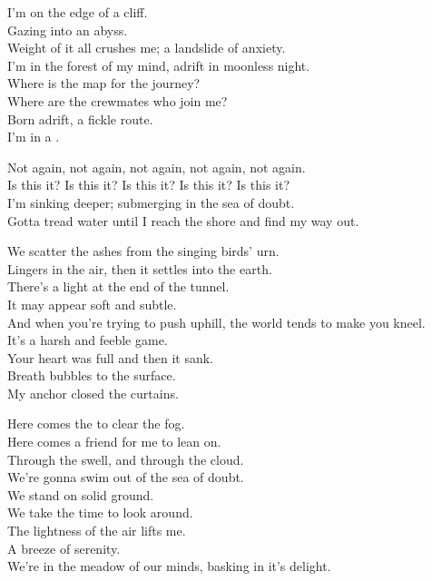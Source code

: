 
I'm on the edge of a cliff. \\
Gazing into an abyss. \\
Weight of it all crushes me; a landslide of anxiety. \\
I'm in the forest of my mind, adrift in moonless night. \\
Where is the map for the journey? \\
Where are the crewmates who join me? \\
Born adrift, a fickle route. \\
I'm in a . \\


Not again, not again, not again, not again, not again. \\
Is this it? Is this it? Is this it? Is this it? Is this it? \\
I'm sinking deeper; submerging in the sea of doubt. \\
Gotta tread water until I reach the shore and find my way out. \\


We scatter the ashes from the singing birds' urn. \\
Lingers in the air, then it settles into the earth. \\
There's a light at the end of the tunnel. \\
It may appear soft and subtle. \\
And when you're trying to push uphill, the world tends to make you kneel. \\
It's a harsh and feeble game. \\
Your heart was full and then it sank. \\
Breath bubbles to the surface. \\
My anchor closed the curtains. \\


Here comes the  to clear the fog. \\
Here comes a friend for me to lean on. \\
Through the swell, and through the cloud. \\
We're gonna swim out of the sea of doubt. \\

We stand on solid ground. \\
We take the time to look around. \\
The lightness of the air lifts me. \\
A breeze of serenity. \\
We're in the meadow of our minds, basking in it's delight. \\

